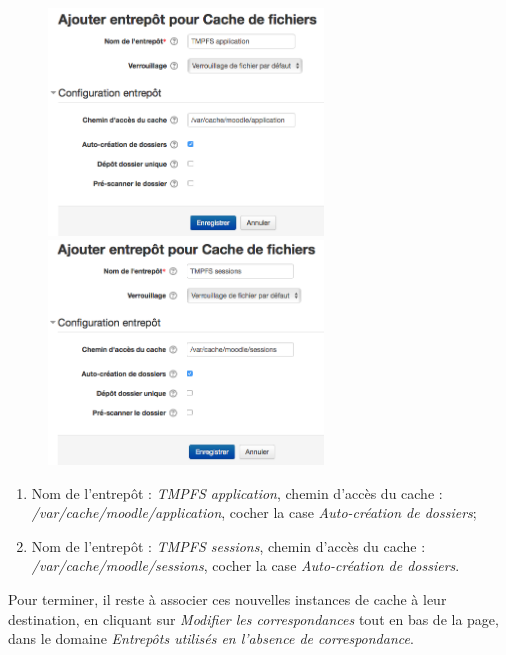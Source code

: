 \documentclass[12pt]{article}
\begin{document}
\begin{figure}[!ht]
\begin{minipage}[b]{0.45\linewidth} %
\centering
\includegraphics[width=7.3cm]{cache-application.png}
\end{minipage}
\hspace{\fill} %
\begin{minipage}[b]{0.45\linewidth}
\centering
\includegraphics[width=7.3cm]{cache-sessions.png}
\end{minipage}
\end{figure}

\begin{enumerate}
\item Nom de l'entrepôt : \emph{TMPFS application}, chemin d'accès du cache : \emph{/var/cache/moodle/application}, cocher la case \emph{Auto-création de dossiers};
\item Nom de l'entrepôt : \emph{TMPFS sessions}, chemin d'accès du cache : \emph{/var/cache/moodle/sessions}, cocher la case \emph{Auto-création de dossiers}.
\end{enumerate}

Pour terminer, il reste à associer ces nouvelles instances de cache à leur destination, en cliquant sur \emph{Modifier les correspondances} tout en bas de la page, dans le domaine \emph{Entrepôts utilisés en l'absence de correspondance}.
\end{document}
